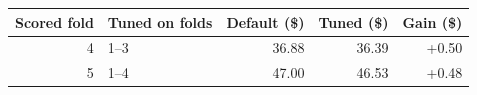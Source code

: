 \begin{tabular}{rlrrr}
\toprule
Scored fold & Tuned on folds & Default (\$) & Tuned (\$) & Gain (\$) \\
\midrule
4 & 1--3 & 36.88 & 36.39 & +0.50 \\
5 & 1--4 & 47.00 & 46.53 & +0.48 \\
\bottomrule
\end{tabular}
